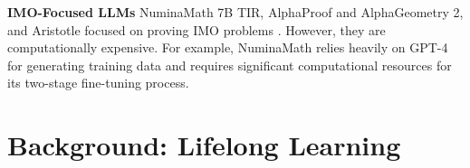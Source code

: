 \documentclass{article} %
\begin{document}


\textbf{IMO-Focused LLMs} NuminaMath 7B TIR, AlphaProof and AlphaGeometry 2, and Aristotle focused on proving IMO problems \citep{numina_math_7b, alphaprofGeometry2024, harmonicAristotle2024}. However, they are computationally expensive. For example, NuminaMath relies heavily on GPT-4 for generating training data and requires significant computational resources for its two-stage fine-tuning process. 


\section{Background: Lifelong Learning}
\label{sec:background}


\end{document}
